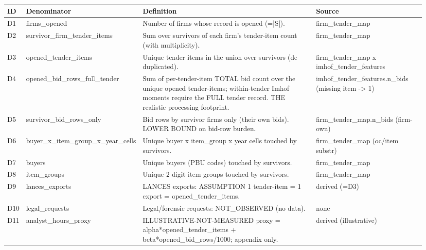 \begin{tabular}{llp{8cm}l}
\toprule
ID & Denominator & Definition & Source \\
\midrule
D1 & firms\_opened & Number of firms whose record is opened (=|S|). & firm\_tender\_map \\
D2 & survivor\_firm\_tender\_items & Sum over survivors of each firm's tender-item count (with multiplicity). & firm\_tender\_map \\
D3 & opened\_tender\_items & Unique tender-items in the union over survivors (de-duplicated). & firm\_tender\_map x imhof\_tender\_features \\
D4 & opened\_bid\_rows\_full\_tender & Sum of per-tender-item TOTAL bid count over the unique opened tender-items; within-tender Imhof moments require the FULL tender record. THE realistic processing footprint. & imhof\_tender\_features.n\_bids (missing item -> 1) \\
D5 & survivor\_bid\_rows\_only & Bid rows by survivor firms only (their own bids). LOWER BOUND on bid-row burden. & firm\_tender\_map.n\_bids (firm-own) \\
D6 & buyer\_x\_item\_group\_x\_year\_cells & Unique buyer x item\_group x year cells touched by survivors. & firm\_tender\_map (oc/item substr) \\
D7 & buyers & Unique buyers (PBU codes) touched by survivors. & firm\_tender\_map \\
D8 & item\_groups & Unique 2-digit item groups touched by survivors. & firm\_tender\_map \\
D9 & lances\_exports & LANCES exports: ASSUMPTION 1 tender-item = 1 export = opened\_tender\_items. & derived (=D3) \\
D10 & legal\_requests & Legal/forensic requests: NOT\_OBSERVED (no data). & none \\
D11 & analyst\_hours\_proxy & ILLUSTRATIVE-NOT-MEASURED proxy = alpha*opened\_tender\_items + beta*opened\_bid\_rows/1000; appendix only. & derived (illustrative) \\
\bottomrule
\end{tabular}
